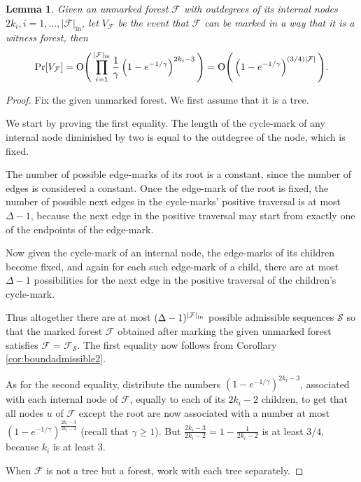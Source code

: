 \documentclass{amsart}
\theoremstyle{plain}
\newtheorem{lemma}{Lemma}
\newcommand{\F}{\mathcal{F}}
\begin{document}
\begin{lemma}\label{lem:finalprob}
Given an {\rm unmarked}  forest $\F$  with   outdegrees  of its  internal nodes  $2k_i, i=1,\ldots,|\F|_{\mathrm{in}}$, let $V_{\F}$ be the event that $\F$ can be marked in a way that it is a witness forest, then 
\begin{equation} \label{eq:VF} \Pr[V_{\F}] = {\rm O} \Bigg( 
\prod_{i=1}^{|\F|_{\rm in}}\frac{1}{\gamma}
\left(1-e^{-1/\gamma}\right)^{2k_i -3} 
\Bigg) 
= {\rm O} \Bigg(\left(1-e^{-1/\gamma}\right)^{(3/4)|\F|}\Bigg). \end{equation}



\end{lemma}
\begin{proof} Fix the given unmarked forest. We first assume that it is a tree.

We start by proving the first equality. 
  The length of the cycle-mark of any internal node diminished by two is equal to the outdegree of the node, which is fixed.

The number of possible edge-marks of its root is a constant, since the number of edges is considered a constant.  Once the edge-mark of the root is fixed, the number of possible next edges in the cycle-marks' positive  traversal is at most $\Delta-1$, because the next edge in the positive traversal may start from exactly one of the endpoints of the edge-mark. 

Now given  the cycle-mark of an internal node, the edge-marks of its children become fixed, and again  for each such edge-mark of a child, there are at most $\Delta-1$ possibilities for the next edge in the positive traversal of the children's  cycle-mark.

Thus altogether there are at most $(\Delta-1)^{|\F|_{\rm in}}$ possible admissible sequences $\mathcal{S}$ so that the marked forest $\F$ obtained after marking the given unmarked forest satisfies $\F = \F_{\mathcal {S}}.$ The first equality now follows from Corollary \ref{cor:boundadmissible2}.

As for the second equality, distribute the numbers $\left(1-e^{-1/\gamma}\right)^{2k_i -3 }$, associated with each 
internal node of $\F$,  equally to each of its $2k_i-2$  children, to get that all nodes $u$ of $\F$ except the root are now associated with a   number at most 
$\left(1-e^{-1/\gamma}\right)^{\frac{2k_i -3}{2k_i-2} }$ (recall that $\gamma \geq 1$). But $\frac{2k_i -3}{2k_i-2} = 1 -\frac{1}{2k_i-2}$ is at least $3/4$, because  $k_i$ is at least 3.

When $\F$ is not a tree but a forest, work with each tree separately.
\end{proof}
\end{document}
